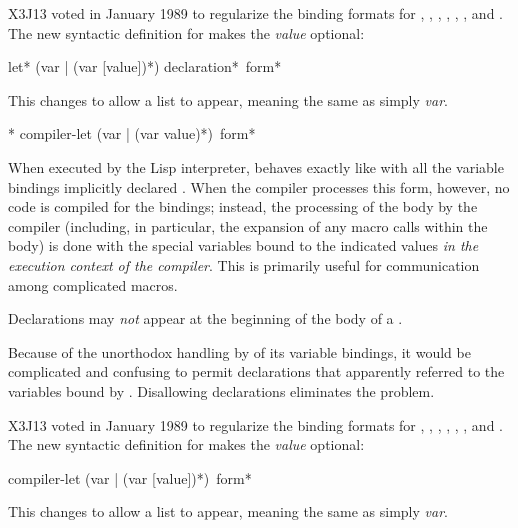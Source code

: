 \begin{defspec}
\begin{new}
X3J13 voted in January 1989
to regularize the binding formats for , , ,
, , , and .
The new syntactic definition for  makes the \emph{value} optional:

\begin{defmac}
let* ({var | (var [value])}*) {declaration}* {\,form}*

This changes  to allow a list  to appear,
meaning the same as simply \emph{var}.
\end{defmac}
\end{new}
\end{defspec}

\begin{obsolete}
\begin{defspec}*
compiler-let ({var | (var value)}*) {\,form}*

When executed by the Lisp interpreter,  behaves
exactly like  with all the variable bindings implicitly
declared .  When the compiler processes this form,
however, no code is compiled for the bindings;
instead, the processing of the body by the compiler
(including, in particular, the expansion of any macro calls
within the body) is done with
the special variables bound to the indicated values \emph{in the
execution context of the compiler}.  This is primarily useful for
communication among complicated macros.

Declarations may \emph{not} appear at the beginning of the body
of a .

\beforenoterule
\begin{rationale}
Because of the unorthodox
handling by  of its variable bindings,
it would be complicated and confusing to permit declarations
that apparently referred to the variables bound by .
Disallowing declarations eliminates the problem.
\end{rationale}
\afternoterule

X3J13 voted in January 1989
to regularize the binding formats for , , ,
, , , and .
The new syntactic definition for  makes the \emph{value} optional:

\begin{defmac}
compiler-let ({var | (var [value])}*) {\,form}*

This changes  to allow a list  to appear,
meaning the same as simply \emph{var}.
\end{defmac}
\end{defspec}
\end{obsolete}

